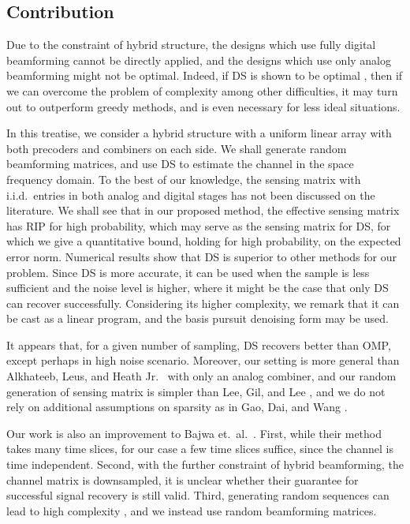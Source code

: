 \documentclass[journal]{IEEEtran}
\begin{document}
\subsection {Contribution}

Due to the constraint of hybrid structure, the designs which use fully digital beamforming cannot be directly applied, and the designs which use only analog beamforming might not be optimal.
Indeed, if DS is shown to be optimal \cite {CaT07}, then if we can overcome the problem of complexity among other difficulties, it may turn out to outperform greedy methods, and is even necessary for less ideal situations.

In this treatise, we consider a hybrid structure with a uniform linear array with both precoders and combiners on each side.
We shall generate random beamforming matrices, and use DS to estimate the channel in the space frequency domain.
To the best of our knowledge, the sensing matrix with i.i.d.\ entries in both analog and digital stages has not been discussed on the literature.
We shall see that in our proposed method, the effective sensing matrix has RIP for high probability, which may serve as the sensing matrix for DS,
for which we give a quantitative bound, holding for high probability, on the expected error norm.
Numerical results show that DS is superior to other methods for our problem.
Since DS is more accurate, it can be used when the sample is less sufficient and the noise level is higher, where it might be the case that only DS can recover successfully.
Considering its higher complexity, we remark that it can be cast as a linear program, and the basis pursuit denoising form may be used.

It appears that, for a given number of sampling, DS recovers better than OMP, except perhaps in high noise scenario.
Moreover, our setting is more general than Alkhateeb, Leus, and Heath Jr.\ \cite {ALH15} with only an analog combiner,
and our random generation of sensing matrix is simpler than Lee, Gil, and Lee \cite {LGL16},
and we do not rely on additional assumptions on sparsity as in Gao, Dai, and Wang \cite {GDW15}.

Our work is also an improvement to Bajwa et.\ al.\ \cite {BHS10}.
First, while their method takes many time slices, for our case a few time slices suffice, since the channel is time independent.
Second, with the further constraint of hybrid beamforming, the channel matrix is downsampled, it is unclear whether their guarantee for successful signal recovery is still valid.
Third, generating random sequences can lead to high complexity \cite {LGL16}, and we instead use random beamforming matrices.
\end{document}
